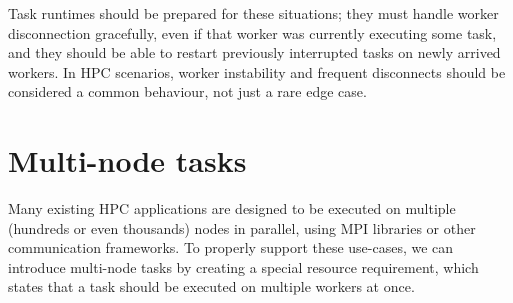 Task runtimes should be prepared for these situations; they must handle worker disconnection
gracefully, even if that worker was currently executing some task, and they should be able to
restart previously interrupted tasks on newly arrived workers. In HPC scenarios, worker instability
and frequent disconnects should be considered a common behaviour, not just a rare edge case.

\section{Multi-node tasks}
Many existing HPC applications are designed to be executed on multiple (hundreds or even thousands)
nodes in parallel, using MPI libraries or other communication frameworks. To properly support these
use-cases, we can introduce multi-node tasks by creating a special resource requirement, which
states that a task should be executed on multiple workers at once.

